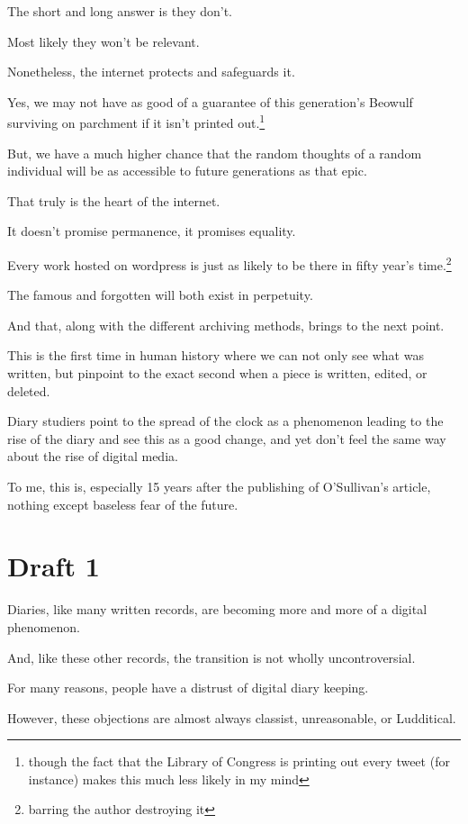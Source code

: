 \documentclass[12pt]{article}[titlepage]
\newcommand{\1}{\={a}}
\newcommand{\2}{\={e}}
\newcommand{\3}{\={\i}}
\newcommand{\4}{\=o}
\newcommand{\5}{\=u}
\newcommand{\6}{\={A}}
\renewcommand{\,}{\textsuperscript{,}}
\begin{document}
The short and long answer is they don’t.

Most likely they won’t be relevant.


Nonetheless, the internet protects and safeguards it.

Yes, we may not have as good of a guarantee of this generation’s Beowulf surviving on parchment if it isn’t printed out.\footnote{though the fact that the Library of Congress is printing out every tweet (for instance) makes this much less likely in my mind}

But, we have a much higher chance that the random thoughts of a random individual will be as accessible to future generations as that epic.


That truly is the heart of the internet.

It doesn’t promise permanence, it promises equality.

Every work hosted on wordpress is just as likely to be there in fifty year’s time.\footnote{barring the author destroying it}

The famous and forgotten will both exist in perpetuity.

And that, along with the different archiving methods, brings to the next point.

This is the first time in human history where we can not only see what was written, but pinpoint to the exact second when a piece is written, edited, or deleted.

Diary studiers point to the spread of the clock as a phenomenon leading to the rise of the diary and see this as a good change, and yet don’t feel the same way about the rise of digital media.

To me, this is, especially 15 years after the publishing of O’Sullivan’s article, nothing except baseless fear of the future.


\section{Draft 1}

Diaries, like many written records, are becoming more and more of a digital phenomenon.

And, like these other records, the transition is not wholly uncontroversial.

For many reasons, people have a distrust of digital diary keeping.

However, these objections are almost always classist, unreasonable, or Ludditical.
\end{document}

